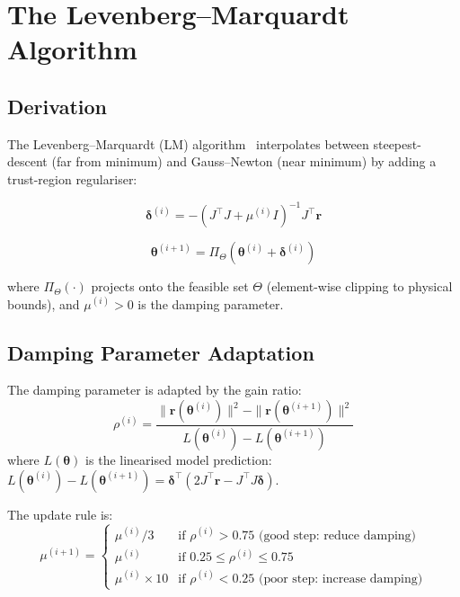\section{The Levenberg--Marquardt Algorithm}
\label{sec:ch2_lm}

\subsection{Derivation}

The Levenberg--Marquardt (LM) algorithm~\citep{Levenberg1944,Marquardt1963}
interpolates between steepest-descent (far from minimum) and
Gauss--Newton (near minimum) by adding a trust-region regulariser:

\begin{equation}
  \bm{\delta}^{(i)} = -(J^\top J + \mu^{(i)} I)^{-1} J^\top \mathbf{r}
  \label{eq:ch2_lm_step}
\end{equation}

\begin{equation}
  \bm{\theta}^{(i+1)} = \Pi_\Theta\left(\bm{\theta}^{(i)} + \bm{\delta}^{(i)}\right)
  \label{eq:ch2_lm_update}
\end{equation}

where $\Pi_\Theta(\cdot)$ projects onto the feasible set $\Theta$ (element-wise
clipping to physical bounds), and $\mu^{(i)} > 0$ is the damping parameter.

\subsection{Damping Parameter Adaptation}

The damping parameter is adapted by the gain ratio:
\begin{equation}
  \rho^{(i)} = \frac{\|\mathbf{r}(\bm{\theta}^{(i)})\|^2
                   - \|\mathbf{r}(\bm{\theta}^{(i+1)})\|^2}
                    {L(\bm{\theta}^{(i)}) - L(\bm{\theta}^{(i+1)})}
  \label{eq:ch2_gain_ratio}
\end{equation}
where $L(\bm{\theta})$ is the linearised model prediction:
$L(\bm{\theta}^{(i)}) - L(\bm{\theta}^{(i+1)}) = \bm{\delta}^\top(2J^\top \mathbf{r} - J^\top J\bm{\delta})$.

The update rule is:
\begin{equation}
  \mu^{(i+1)} = \begin{cases}
    \mu^{(i)} / 3  & \text{if } \rho^{(i)} > 0.75 \text{ (good step: reduce damping)}\\
    \mu^{(i)}      & \text{if } 0.25 \leq \rho^{(i)} \leq 0.75 \\
    \mu^{(i)} \times 10 & \text{if } \rho^{(i)} < 0.25 \text{ (poor step: increase damping)}
  \end{cases}
  \label{eq:ch2_mu_adapt}
\end{equation}

